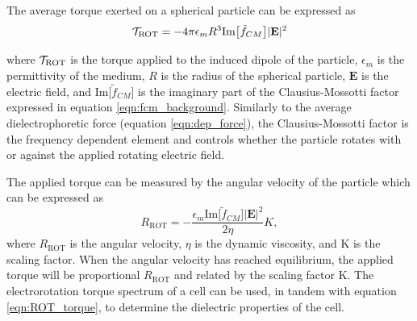  \par The average torque exerted on a spherical particle can be expressed as \cite{morgan_single_2007}
 \begin{equation}
    \mathcal{T}_{\text{ROT}} = -4\pi \epsilon_m R^3 \text{Im}\big[\tilde{f}_{CM}\big]|\textbf{E}|^2
    \label{eqn:ROT_torque}
 \end{equation}
 
 \noindent where $\mathcal{T}_{\text{ROT}}$ is the torque applied to the induced dipole of the particle, $\epsilon_m$ is the permittivity of the medium, $R$ is the radius of the spherical particle, $\textbf{E}$ is the electric field, and $\text{Im}\big[\tilde{f}_{CM}\big]$ is the imaginary part of the Clausius-Mossotti factor expressed in equation \ref{eqn:fcm_background}. Similarly to the average dielectrophoretic force (equation \ref{eqn:dep_force}), the Clausius-Mossotti factor is the frequency dependent element and controls whether the particle rotates with or against the applied rotating electric field.
 
 \par The applied torque can be measured by the angular velocity of the particle which can be expressed as \cite{morgan_ac_2003}
 \begin{equation}
     R_{\text{ROT}} = - \frac{\epsilon_m\text{Im}\big[\tilde{f}_{CM}\big]|\textbf{E}|^2}{2\eta}K, 
 \end{equation}
 \noindent where $R_{\text{ROT}}$ is the angular velocity, $\eta$ is the dynamic viscosity, and K is the scaling factor. When the angular velocity has reached equilibrium, the applied torque will be proportional $R_{\text{ROT}}$ and related by the scaling factor K. The electrorotation torque spectrum of a cell can be used, in tandem with equation \ref{eqn:ROT_torque}, to determine the dielectric properties of the cell. 
 
